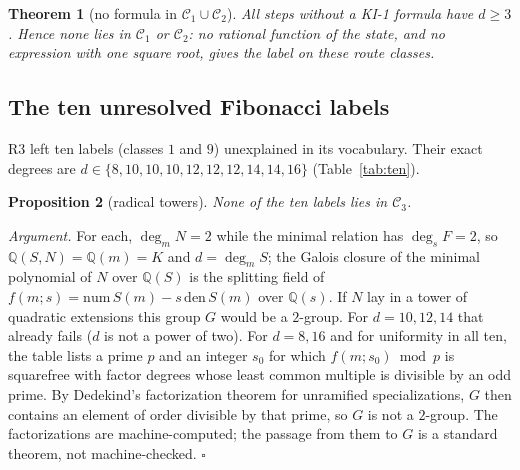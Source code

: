 \documentclass[11pt]{article}
\newtheorem{theorem}{Theorem}
\newtheorem{proposition}[theorem]{Proposition}
\theoremstyle{definition}
\theoremstyle{remark}
\newcommand{\Q}{\mathbb{Q}}
\begin{document}
\begin{table}[h]\centering\small
\caption{Exact degree $d$ of the label over $\Q(S)$ for the steps without a formula; ``field'' and ``unexplained'' are the R3 audit classes.}

\end{table}

\begin{theorem}[no formula in $\mathcal C_1\cup\mathcal C_2$]\label{thm:c2}
All \NonClosed{} steps without a KI-1 formula have $d\ge 3$. Hence none lies in $\mathcal C_1$ or $\mathcal C_2$: no rational function of the state, and no expression with one square root, gives the label on these route classes.
\end{theorem}

\subsection{The ten unresolved Fibonacci labels}\label{sec:tower}
R3 left ten labels (classes $1$ and $9$) unexplained in its vocabulary. Their exact degrees are $d\in\{8,10,10,10,12,12,12,14,14,16\}$ (Table~\ref{tab:ten}).
\begin{proposition}[radical towers]\label{prop:tower}
None of the ten labels lies in $\mathcal C_3$.
\end{proposition}
\emph{Argument.} For each, $\deg_mN=2$ while the minimal relation has $\deg_sF=2$, so $\Q(S,N)=\Q(m)=K$ and $d=\deg_mS$; the Galois closure of the minimal polynomial of $N$ over $\Q(S)$ is the splitting field of $f(m;s)=\mathrm{num}\,S(m)-s\,\mathrm{den}\,S(m)$ over $\Q(s)$. If $N$ lay in a tower of quadratic extensions this group $G$ would be a $2$-group. For $d=10,12,14$ that already fails ($d$ is not a power of two). For $d=8,16$ and for uniformity in all ten, the table lists a prime $p$ and an integer $s_0$ for which $f(m;s_0)\bmod p$ is squarefree with factor degrees whose least common multiple is divisible by an odd prime. By Dedekind's factorization theorem for unramified specializations, $G$ then contains an element of order divisible by that prime, so $G$ is not a $2$-group. The factorizations are machine-computed; the passage from them to $G$ is a standard theorem, not machine-checked. \hfill$\square$

\begin{table}[h]\centering\small
\caption{The ten unresolved labels: degrees of label and state in the conic parameter $m$, exact degree $d$ over $\Q(S)$, and the specialization certificate.}\label{tab:ten}

\end{table}
\end{document}

